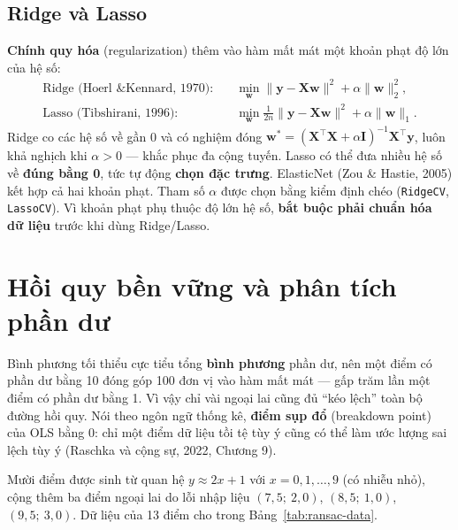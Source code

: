 
\subsection{Ridge và Lasso}

\textbf{Chính quy hóa} (regularization) thêm vào hàm mất mát một khoản phạt độ lớn của hệ số:
\begin{align}
    \text{Ridge (Hoerl \& Kennard, 1970)}: \quad & \min_{\mathbf{w}} \|\mathbf{y} - \mathbf{X}\mathbf{w}\|^2 + \alpha \|\mathbf{w}\|_2^2, \\
    \text{Lasso (Tibshirani, 1996)}: \quad & \min_{\mathbf{w}} \tfrac{1}{2n}\|\mathbf{y} - \mathbf{X}\mathbf{w}\|^2 + \alpha \|\mathbf{w}\|_1 .
\end{align}
Ridge co các hệ số về gần 0 và có nghiệm đóng $\mathbf{w}^* = (\mathbf{X}^\top\mathbf{X} + \alpha\mathbf{I})^{-1}\mathbf{X}^\top\mathbf{y}$, luôn khả nghịch khi $\alpha > 0$ --- khắc phục đa cộng tuyến. Lasso có thể đưa nhiều hệ số về \textbf{đúng bằng 0}, tức tự động \textbf{chọn đặc trưng}. ElasticNet (Zou \& Hastie, 2005) kết hợp cả hai khoản phạt. Tham số $\alpha$ được chọn bằng kiểm định chéo (\texttt{RidgeCV}, \texttt{LassoCV}). Vì khoản phạt phụ thuộc độ lớn hệ số, \textbf{bắt buộc phải chuẩn hóa dữ liệu} trước khi dùng Ridge/Lasso.

\section{Hồi quy bền vững và phân tích phần dư}
\label{sec:robust-regression}

Bình phương tối thiểu cực tiểu tổng \textbf{bình phương} phần dư, nên một điểm có phần dư bằng 10 đóng góp 100 đơn vị vào hàm mất mát --- gấp trăm lần một điểm có phần dư bằng 1. Vì vậy chỉ vài ngoại lai cũng đủ ``kéo lệch'' toàn bộ đường hồi quy. Nói theo ngôn ngữ thống kê, \textbf{điểm sụp đổ} (breakdown point) của OLS bằng 0: chỉ một điểm dữ liệu tồi tệ tùy ý cũng có thể làm ước lượng sai lệch tùy ý (Raschka và cộng sự, 2022, Chương 9).

\begin{example}
Mười điểm được sinh từ quan hệ $y \approx 2x + 1$ với $x = 0, 1, \dots, 9$ (có nhiễu nhỏ), cộng thêm ba điểm ngoại lai do lỗi nhập liệu $(7{,}5;\ 2{,}0)$, $(8{,}5;\ 1{,}0)$, $(9{,}5;\ 3{,}0)$. Dữ liệu của 13 điểm cho trong Bảng~\ref{tab:ransac-data}.
\end{example}

